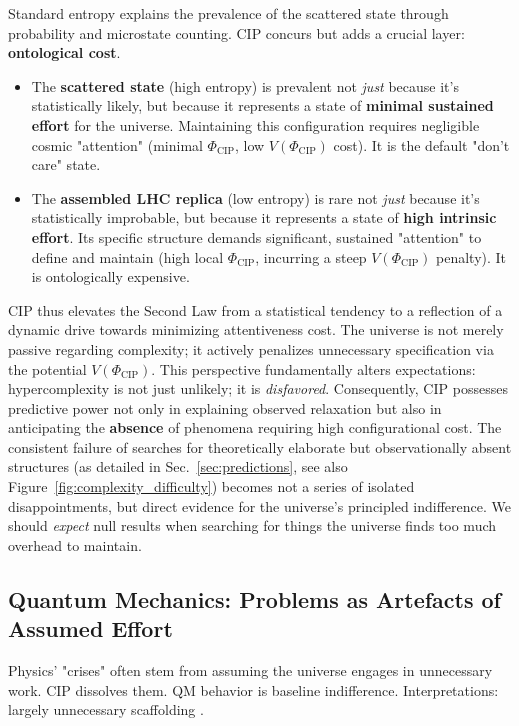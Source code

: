 \documentclass[11pt, a4paper]{article}
\newcommand{\subt}[1]{\mathrm{#1}}
\begin{document}
Standard entropy explains the prevalence of the scattered state through probability and microstate counting. CIP concurs but adds a crucial layer: \textbf{ontological cost}.
\begin{itemize}
    \item The \textbf{scattered state} (high entropy) is prevalent not \textit{just} because it's statistically likely, but because it represents a state of \textbf{minimal sustained effort} for the universe. Maintaining this configuration requires negligible cosmic "attention" (minimal $\Phi_{\subt{CIP}}$, low $V(\Phi_{\subt{CIP}})$ cost). It is the default "don't care" state.
    \item The \textbf{assembled LHC replica} (low entropy) is rare not \textit{just} because it's statistically improbable, but because it represents a state of \textbf{high intrinsic effort}. Its specific structure demands significant, sustained "attention" to define and maintain (high local $\Phi_{\subt{CIP}}$, incurring a steep $V(\Phi_{\subt{CIP}})$ penalty). It is ontologically expensive.
\end{itemize}

CIP thus elevates the Second Law from a statistical tendency to a reflection of a dynamic drive towards minimizing attentiveness cost. The universe is not merely passive regarding complexity; it actively penalizes unnecessary specification via the potential $V(\Phi_{\subt{CIP}})$. This perspective fundamentally alters expectations: hypercomplexity is not just unlikely; it is \textit{disfavored}. Consequently, CIP possesses predictive power not only in explaining observed relaxation but also in anticipating the \textbf{absence} of phenomena requiring high configurational cost. The consistent failure of searches for theoretically elaborate but observationally absent structures (as detailed in Sec.~\ref{sec:predictions}, see also Figure~\ref{fig:complexity_difficulty}) becomes not a series of isolated disappointments, but direct evidence for the universe's principled indifference. We should \textit{expect} null results \cite{Popper1959, MichelsonMorley1887} when searching for things the universe finds too much overhead to maintain.

\subsection{Quantum Mechanics: Problems as Artefacts of Assumed Effort}

Physics' "crises" often stem from assuming the universe engages in unnecessary work. CIP dissolves them. QM behavior is baseline indifference. Interpretations: largely unnecessary scaffolding \cite{PenroseComplexity}.
\end{document}
